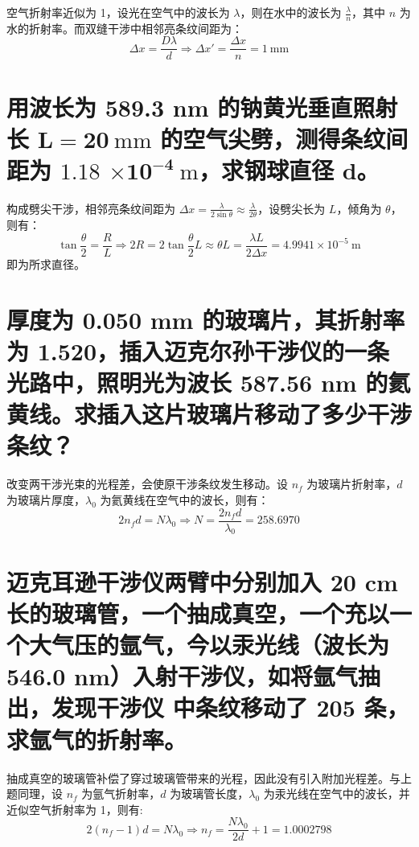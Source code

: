 \documentclass[UTF8]{report}
\theoremstyle{MyLineTheoremStyle} %
\theoremstyle{MyBlockTheoremStyle} %
\theoremstyle{MySubsubsectionStyle} %
\begin{document}
空气折射率近似为 1，设光在空气中的波长为 $\lambda$，则在水中的波长为 $\frac{\lambda}{n}$，其中 $n$ 为水的折射率。而双缝干涉中相邻亮条纹间距为：
\begin{equation}
\Delta x = \frac{D \lambda}{d} \Longrightarrow \Delta x' = \frac{\Delta x}{n} = 1\ \mathrm{mm}
\end{equation}

\section{用波长为 589.3 nm 的钠黄光垂直照射长 $\boldsymbol{L = 20 \ \mathrm{mm}}$  的空气尖劈，测得条纹间距为 $\boldsymbol{1.18}$ $\boldsymbol{ \times 10^{-4}\ \mathrm{m}}$，求钢球直径 $\boldsymbol{d}$。}

构成劈尖干涉，相邻亮条纹间距为 $\Delta x = \frac{\lambda}{2 \sin \theta} \approx  \frac{\lambda}{2 \theta} $，设劈尖长为 $L$，倾角为 $\theta$，则有：
\begin{equation}
\tan \frac{\theta}{2} = \frac{R}{L} \Longrightarrow 2R = 2\tan \frac{\theta}{2} L  \approx \theta L  = \frac{\lambda L}{2 \Delta x} = 4.9941 \times 10^{-5}\ \mathrm{m}
\end{equation}
即为所求直径。

\section{厚度为 0.050 mm 的玻璃片，其折射率为 1.520，插入迈克尔孙干涉仪的一条光路中，照明光为波长 587.56 nm 的氦黄线。求插入这片玻璃片移动了多少干涉条纹？}

改变两干涉光束的光程差，会使原干涉条纹发生移动。设 $n_f$ 为玻璃片折射率，$d$ 为玻璃片厚度，$\lambda_0$ 为氦黄线在空气中的波长，则有：
\begin{equation}
2 n_f d = N\lambda_0 \Longrightarrow N = \frac{2 n_f d}{\lambda_0} = 258.6970
\end{equation}

\section{迈克耳逊干涉仪两臂中分别加入 20 cm 长的玻璃管，一个抽成真空，一个充以一个大气压的氩气，今以汞光线（波长为 546.0 nm）入射干涉仪，如将氩气抽出，发现干涉仪
中条纹移动了 205 条，求氩气的折射率。}

抽成真空的玻璃管补偿了穿过玻璃管带来的光程，因此没有引入附加光程差。与上题同理，设 $n_f$ 为氩气折射率，$d$ 为玻璃管长度，$\lambda_0$ 为汞光线在空气中的波长，并近似空气折射率为 1，则有: 
\begin{equation}
2 (n_f-1) d = N\lambda_0 \Longrightarrow n_f = \frac{N \lambda_0}{2d} + 1 = 1.0002798
\end{equation}
\end{document}
